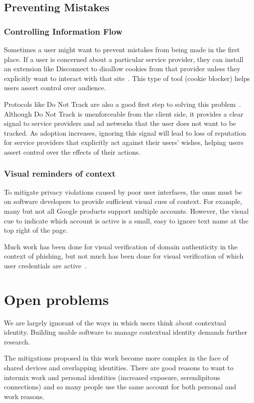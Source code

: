 \documentclass[10pt, conference, compsocconf]{IEEEtran}
\begin{document}
\subsection{Preventing Mistakes}
\subsubsection{Controlling Information Flow}
Sometimes a user might want to prevent mistakes from being made in the first
place. If a user is concerned about a particular service provider, they can
install an extension like Disconnect to disallow cookies from that provider
unless they explicitly want to interact with that site~\cite{disconnect}.
This type of tool (cookie blocker) helps users assert control over audience.

Protocols like Do Not Track are also a good first step to solving this
problem~\cite{dnt}. Although Do Not Track is unenforceable from the client
side, it provides a clear signal to service providers and ad networks
that the user does not want to be tracked. As adoption increases, ignoring this
signal will lead to loss of reputation for service providers that explicitly
act against their users' wishes, helping
users assert control over the effects of their actions.

\subsubsection{Visual reminders of context}
To mitigate privacy violations caused by poor user interfaces, the onus must be
on software developers to provide sufficient visual cues of context. For
example, many but not all Google products support multiple accounts. However,
the visual cue to indicate which account is active is a small, easy to ignore
text name at the top right of the page.

Much work has been done for visual verification of domain authenticity in the
context of phishing, but not much has been done for visual verification of
which user credentials are active~\cite{skins}.

\section{Open problems}
We are largely ignorant of the ways in which users think about contextual
identity. Building usable software to manage contextual identity demands
further research.

The mitigations proposed in this work become more complex in the face of shared
devices and overlapping identities. There are good reasons to want to intermix
work and personal identities (increased exposure, serendipitous connections)
and so many people use the same account for both personal and work reasons.
\end{document}
